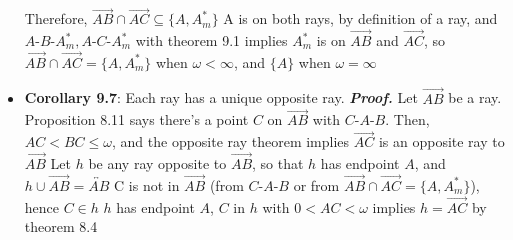\documentclass{report}
\begin{document}
\begin{itemize}
            \bigbreak \noindent 
            Therefore, $ \overrightarrow{AB} \cap \overrightarrow{AC} \subseteq \{A, A_{m}^{*}\} $
            \bigbreak \noindent 
            A is on both rays, by definition of a ray, and $ A\text{-}B\text{-} A_{m}^{*}, A\text{-}C\text{-}A_{m}^{*}$ with theorem 9.1 implies $A_{m}^{*}$ is on $\overrightarrow{AB}$ and $\overrightarrow{AC}$, so $\overrightarrow{AB} \cap \overrightarrow{AC} = \{A,A_{m}^{*}\}$ when $\omega < \infty $, and $\{A\}$ when $\omega = \infty $
        \item \textbf{Corollary 9.7}: Each ray has a unique opposite ray.
            \bigbreak \noindent 
            \textbf{\textit{Proof.}} Let $\overrightarrow{AB}$ be a ray. Proposition 8.11 says there's a point $C$ on $\overrightarrow{AB}$ with $ C\text{-}A\text{-}B$. Then, $AC<BC \leq \omega$, and the opposite ray theorem implies $\overrightarrow{AC}$ is an opposite ray to $\overrightarrow{AB} $
            \bigbreak \noindent 
            Let $h$ be any ray opposite to $\overrightarrow{AB}$, so that $h$ has endpoint $A$, and $h \cup \overrightarrow{AB} = \overleftrightarrow{AB}$
            \bigbreak \noindent 
            C is not in $\overrightarrow{AB}$ (from $ C\text{-}A\text{-}B$ or from $\overrightarrow{AB} \cap \overrightarrow{AC} = \{A,A_{m}^{*}\}$), hence $C \in h $
            \bigbreak \noindent 
            $h$ has endpoint $A$, $C$ in $h$ with $0 < AC < \omega$ implies $h = \overrightarrow{AC} $ by theorem 8.4


\end{itemize}
\end{document}
